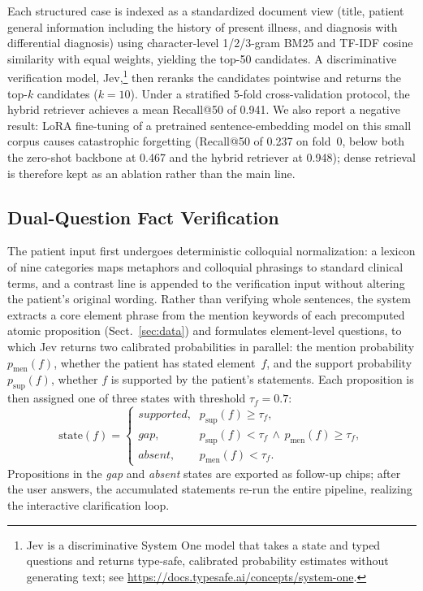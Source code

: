 Each structured case is indexed as a standardized document view (title, patient general information including the history of present illness, and diagnosis with differential diagnosis) using character-level 1/2/3-gram BM25 and TF-IDF cosine similarity with equal weights, yielding the top-50 candidates. A discriminative verification model, Jev,\footnote{Jev is a discriminative System One model that takes a state and typed questions and returns type-safe, calibrated probability estimates without generating text; see \url{https://docs.typesafe.ai/concepts/system-one}.} then reranks the candidates pointwise and returns the top-$k$ candidates ($k=10$). Under a stratified 5-fold cross-validation protocol, the hybrid retriever achieves a mean Recall@50 of 0.941. We also report a negative result: LoRA fine-tuning of a pretrained sentence-embedding model on this small corpus causes catastrophic forgetting (Recall@50 of 0.237 on fold~0, below both the zero-shot backbone at 0.467 and the hybrid retriever at 0.948); dense retrieval is therefore kept as an ablation rather than the main line.

\subsection{Dual-Question Fact Verification}

The patient input first undergoes deterministic colloquial normalization: a lexicon of nine categories maps metaphors and colloquial phrasings to standard clinical terms, and a contrast line is appended to the verification input without altering the patient's original wording. Rather than verifying whole sentences, the system extracts a core element phrase from the mention keywords of each precomputed atomic proposition (Sect.~\ref{sec:data}) and formulates element-level questions, to which Jev returns two calibrated probabilities in parallel: the mention probability $p_{\mathrm{men}}(f)$, whether the patient has stated element~$f$, and the support probability $p_{\mathrm{sup}}(f)$, whether $f$ is supported by the patient's statements. Each proposition is then assigned one of three states with threshold $\tau_f=0.7$:
\begin{equation}
\mathrm{state}(f)=
\begin{cases}
\textit{supported}, & p_{\mathrm{sup}}(f)\ge\tau_f,\\[2pt]
\textit{gap}, & p_{\mathrm{sup}}(f)<\tau_f \,\wedge\, p_{\mathrm{men}}(f)\ge\tau_f,\\[2pt]
\textit{absent}, & p_{\mathrm{men}}(f)<\tau_f.
\end{cases}
\label{eq:threestate}
\end{equation}
Propositions in the \textit{gap} and \textit{absent} states are exported as follow-up chips; after the user answers, the accumulated statements re-run the entire pipeline, realizing the interactive clarification loop.

